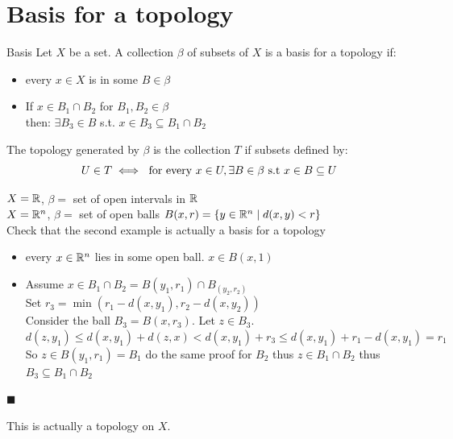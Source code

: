 \section{Basis for a topology}
\begin{definition}{Basis}{}
    Let $X$ be a set. A collection $\beta$ of subsets of $X$ is
    a basis for a topology if:
    \begin{itemize}
        \item every $x\in X$ is in some $B \in \beta$
        \item If $x \in B_1 \cap B_2$ for $B_1,B_2 \in \beta$\\
        then: $\exists B_3 \in B$ s.t. $x \in B_3 \subseteq B_1 \cap B_2$
    \end{itemize}
    The topology generated by $\beta$ is the collection $T$ if subsets defined by:
    \[U \in T \iff \text{ for every } x\in U, \exists B \in \beta \text{ s.t } x\in B \subseteq U\]
\end{definition}
\begin{example*}{}{}
    $X = \mathbb{R}$, $\beta=$ set of open intervals in $\mathbb{R}$\\
    $X = \mathbb{R}^n$, $\beta=$ set of open balls $B(x,r)=\{y \in \mathbb{R}^n \mid d(x,y) < r\}$\\
    Check that the second example is actually a basis for a topology
    \begin{itemize}
        \item every $x \in \mathbb{R}^n$ lies in some open ball. $x \in B(x,1)$
        \item Assume $x \in B_1 \cap B_2=B(y_1,r_1) \cap B_(y_2,r_2)$\\
        Set $r_3=\min(r_1-d(x,y_1),r_2-d(x,y_2))$\\
        Consider the ball $B_3=B(x,r_3)$. Let $z \in B_3$.\\
        $d(z,y_1) \leq d(x,y_1) + d(z,x) < d(x,y_1) + r_3 \leq d(x,y_1) + r_1 - d(x,y_1)=r_1$\\
        So $z \in B(y_1,r_1) = B_1$ do the same proof for $B_2$ thus $z \in B_1 \cap B_2$ thus $B_3 \subseteq B_1 \cap B_2$
    \end{itemize}
    \textcolor{exmscol!50!white}{\hbox{}\nobreak\hfill$\blacksquare$}
\end{example*}
\begin{proposition}{}{}
    This is actually a topology on $X$.
\end{proposition}
